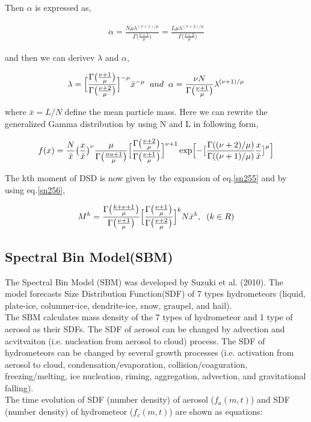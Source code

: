 Then $\alpha$ is expressed as,

\begin{eqnarray}
\alpha=\frac{N\mu\lambda^{(\nu+1)/\mu}}{\Gamma\bigl(\frac{\nu+1}{\mu}\bigr)}=\frac{L\mu \lambda^{(\nu+2)/\mu}}{\Gamma\bigl(\frac{\nu+2}{\mu}\bigr)}\nonumber
\end{eqnarray}

and then we can derivev $\lambda$ and $\alpha$,

\begin{eqnarray}
\lambda=\Bigl[\frac{\Gamma\bigl(\frac{\nu+1}{\mu}\bigr)}{\Gamma\bigl(\frac{\nu+2}{\mu}\bigr)}\Bigr]^{-\mu}\bar{x}^{-\mu}\;\;and\;\;\alpha=\frac{\nu N}{\Gamma\bigl(\frac{\nu+1}{\mu}\bigr)}\lambda^{(\nu+1)/\mu}\label{sn256}
\end{eqnarray}

where $\bar{x}=L/N$ define the mean particle mass. Here we can rewrite the generalized Gamma distribution by using N and L in following form,

\begin{eqnarray}
f(x)=\frac{N}{\bar{x}}\bigl(\frac{x}{\bar{x}}\bigr)^{\nu}\frac{\mu}{\Gamma\bigl(\frac{nu+1}{\mu}\bigr)}\Bigl[\frac{\Gamma\bigl(\frac{\nu+2}{\mu}\bigr)}{\Gamma\bigl(\frac{\nu+1}{\mu}\bigr)}\Bigr]^{\nu+1}\exp\Bigl[-\bigl[\frac{\Gamma((\nu+2)/\mu)}{\Gamma((\nu+1)/\mu)}\frac{x}{\bar{x}}\bigr]^{\mu}\Bigr]\label{sn257}
\end{eqnarray}

The kth moment of DSD is now given by the expansion of eq.\ref{sn255} and by using eq.\ref{sn256},

\begin{eqnarray}
M^{k}=\frac{\Gamma\bigl(\frac{k+\nu+1}{\mu}\bigr)}{\Gamma\bigl(\frac{\nu+1}{\mu}\bigr)}\Bigl[\frac{\Gamma\bigl(\frac{\nu+1}{\mu}\bigr)}{\Gamma\bigl(\frac{\nu+2}{\mu}\bigr)}\Bigr]^{k}N\bar{x}^{k},\;\;(k\in R)
\end{eqnarray}


\subsection{Spectral Bin Model(SBM)\cite{suzuki_etal_2010}}
The Spectral Bin Model (SBM) was developed by Suzuki et al. (2010)\cite{suzuki_etal_2010}. The model forecasts Size Distribution Function(SDF) of 7 types hydrometeors (liquid, plate-ice, columner-ice, dendrite-ice, snow, graupel, and hail). \\
The SBM calculates mass density of the 7 types of hydrometeor and 1 type of aerosol as their SDFs. The SDF of aerosol can be changed by advection and acvitvaiton (i.e. nucleation from aerosol to cloud) process. The SDF of hydrometeors can be changed by several growth processes (i.e. activation from aerosol to cloud, condensation/evaporation, collision/coaguration, freezing/melting, ice nucleation, riming, aggregation, advection, and gravitational falling). \\
The time evolution of SDF (number density) of aerosol ($f_{a}(m,t)$) and SDF (number density) of hydrometeor ($f_{c}(m,t)$) are shown as equations:

